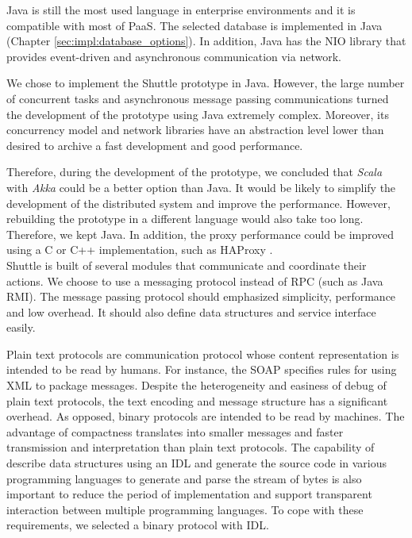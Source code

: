Java is still the most used language in enterprise environments and it is compatible with most of \ac{PaaS}. The selected database is implemented in Java (Chapter \ref{sec:impl:database_options}). In addition, Java has the \acf{NIO} library that provides event-driven and asynchronous communication via network. %

We chose to implement the Shuttle prototype in Java. However, the large number of concurrent tasks and asynchronous message passing communications turned the development of the prototype using Java extremely complex. Moreover, its concurrency model and network libraries have an abstraction level lower than desired to archive a fast development and good performance.

Therefore, during the development of the prototype, we concluded that \emph{Scala} with \emph{Akka} could be a better option than Java. It would be likely to simplify the development of the distributed system and improve the performance. However, rebuilding the prototype in a different language would also take too long. Therefore, we kept Java.
In addition, the proxy performance could be improved using a C or C++ implementation, such as HAProxy \cite{haproxy}. \\

Shuttle is built of several modules that communicate and coordinate their actions. We choose to use a messaging protocol instead of \acf{RPC} (such as Java \acf{RMI}). The message passing protocol should emphasized simplicity, performance and low overhead. It should also define data structures and service interface easily. 

Plain text protocols are communication protocol whose content representation is intended to be read by humans. For instance, the \acf{SOAP} \cite{soap} specifies rules for using XML to package messages. Despite the heterogeneity and easiness of debug of plain text protocols, the text encoding and message structure has a significant overhead. As opposed, binary protocols are intended to be read by machines. The advantage of compactness translates into smaller messages and faster transmission and interpretation than plain text protocols. The capability of describe data structures using an \acf{IDL} and generate the source code in various programming languages to generate and parse the stream of bytes is also important to reduce the period of implementation and support transparent interaction between multiple programming languages. To cope with these requirements, we selected a binary protocol with \ac{IDL}. 

